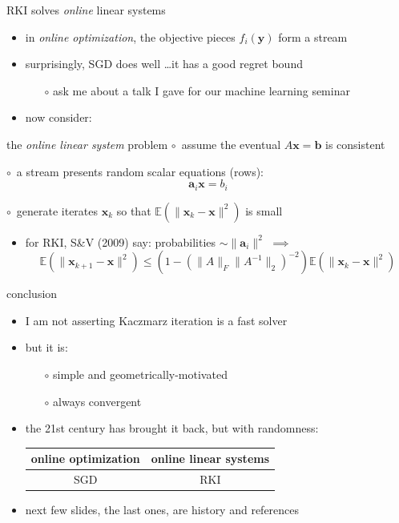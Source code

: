 \documentclass[usepdftitle=false,usenames,dvipsnames]{beamer}
\newcommand{\EE}{\mathbb{E}}
\newcommand{\ba}{\mathbf{a}}
\newcommand{\bb}{\mathbf{b}}
\newcommand{\bx}{\mathbf{x}}
\newcommand{\by}{\mathbf{y}}
\begin{document}
\begin{frame}{RKI solves \emph{online} linear systems}

\begin{itemize}
\item in \emph{online optimization}, the objective pieces $f_i(\by)$ form a stream
\item surprisingly, SGD does well \dots it has a good regret bound

    \begin{itemize}
    \item[$\circ$] ask me about a talk I gave for our machine learning seminar
    \end{itemize}
\item now consider:
\end{itemize}

\begin{block}{the \emph{online linear system} problem}
$\circ$\, assume the eventual $A\bx=\bb$ is consistent

$\circ$\, a stream presents random scalar equations (rows):
    $$\ba_i \bx = b_i$$

$\circ$\, generate iterates $\bx_k$ so that $\EE\left(\|\bx_k - \bx\|^2\right)$ is small
\end{block}

\begin{itemize}
\item for RKI, S\&V (2009) say: probabilities $\sim \|\ba_i\|^2$ $\implies$
    $$\EE\left(\|\bx_{k+1} - \bx\|^2\right) \le \left(1 - (\|A\|_F \|A^{-1}\|_2)^{-2}\right)\EE\left(\|\bx_k - \bx\|^2\right)$$
\end{itemize}
\end{frame}


\begin{frame}{conclusion}

\begin{itemize}
\item I am not asserting Kaczmarz iteration is a fast solver
\item but it is:

    \begin{itemize}
    \item[$\circ$] simple and geometrically-motivated
    \item[$\circ$] always convergent
    \end{itemize}
\item the 21st century has brought it back, but with randomness:

\begin{center}
\begin{tabular}{c|c}
online optimization & online linear systems \\ \hline
SGD & RKI
\end{tabular}
\end{center}

\item next few slides, the last ones, are history and references
\end{itemize}
\end{frame}
\end{document}
